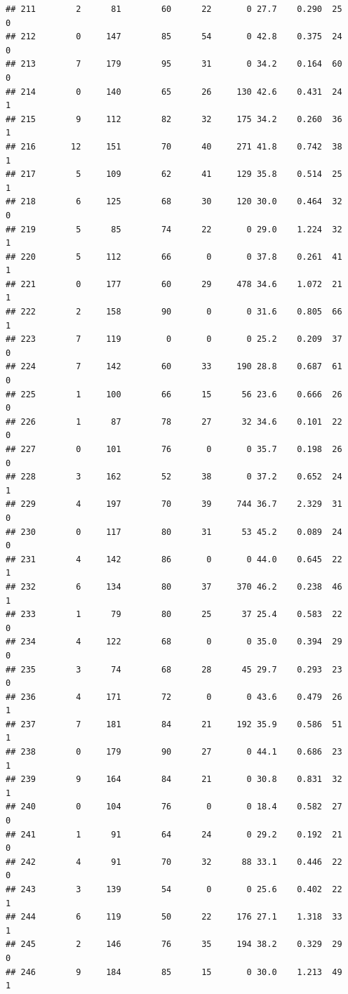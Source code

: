 \documentclass[11pt, a4paper]{article}\usepackage[]{graphicx}\usepackage[]{xcolor}
\makeatletter
\newenvironment{kframe}{%
 \def\at@end@of@kframe{}%
 \ifinner\ifhmode%
  \def\at@end@of@kframe{\end{minipage}}%
  \begin{minipage}{\columnwidth}%
 \fi\fi%
 \def\FrameCommand##1{\hskip\@totalleftmargin \hskip-\fboxsep
 \colorbox{shadecolor}{##1}\hskip-\fboxsep
     \hskip-\linewidth \hskip-\@totalleftmargin \hskip\columnwidth}%
 \MakeFramed {\advance\hsize-\width
   \@totalleftmargin\z@ \linewidth\hsize
   \@setminipage}}%
 {\par\unskip\endMakeFramed%
 \at@end@of@kframe}
\newenvironment{knitrout}{}{} %
\makeatother
\begin{document}
\begin{knitrout}
\begin{kframe}
\begin{verbatim}
## 211        2      81        60      22       0 27.7    0.290  25    0
## 212        0     147        85      54       0 42.8    0.375  24    0
## 213        7     179        95      31       0 34.2    0.164  60    0
## 214        0     140        65      26     130 42.6    0.431  24    1
## 215        9     112        82      32     175 34.2    0.260  36    1
## 216       12     151        70      40     271 41.8    0.742  38    1
## 217        5     109        62      41     129 35.8    0.514  25    1
## 218        6     125        68      30     120 30.0    0.464  32    0
## 219        5      85        74      22       0 29.0    1.224  32    1
## 220        5     112        66       0       0 37.8    0.261  41    1
## 221        0     177        60      29     478 34.6    1.072  21    1
## 222        2     158        90       0       0 31.6    0.805  66    1
## 223        7     119         0       0       0 25.2    0.209  37    0
## 224        7     142        60      33     190 28.8    0.687  61    0
## 225        1     100        66      15      56 23.6    0.666  26    0
## 226        1      87        78      27      32 34.6    0.101  22    0
## 227        0     101        76       0       0 35.7    0.198  26    0
## 228        3     162        52      38       0 37.2    0.652  24    1
## 229        4     197        70      39     744 36.7    2.329  31    0
## 230        0     117        80      31      53 45.2    0.089  24    0
## 231        4     142        86       0       0 44.0    0.645  22    1
## 232        6     134        80      37     370 46.2    0.238  46    1
## 233        1      79        80      25      37 25.4    0.583  22    0
## 234        4     122        68       0       0 35.0    0.394  29    0
## 235        3      74        68      28      45 29.7    0.293  23    0
## 236        4     171        72       0       0 43.6    0.479  26    1
## 237        7     181        84      21     192 35.9    0.586  51    1
## 238        0     179        90      27       0 44.1    0.686  23    1
## 239        9     164        84      21       0 30.8    0.831  32    1
## 240        0     104        76       0       0 18.4    0.582  27    0
## 241        1      91        64      24       0 29.2    0.192  21    0
## 242        4      91        70      32      88 33.1    0.446  22    0
## 243        3     139        54       0       0 25.6    0.402  22    1
## 244        6     119        50      22     176 27.1    1.318  33    1
## 245        2     146        76      35     194 38.2    0.329  29    0
## 246        9     184        85      15       0 30.0    1.213  49    1

\end{verbatim}
\end{kframe}
\end{knitrout}
\end{document}
